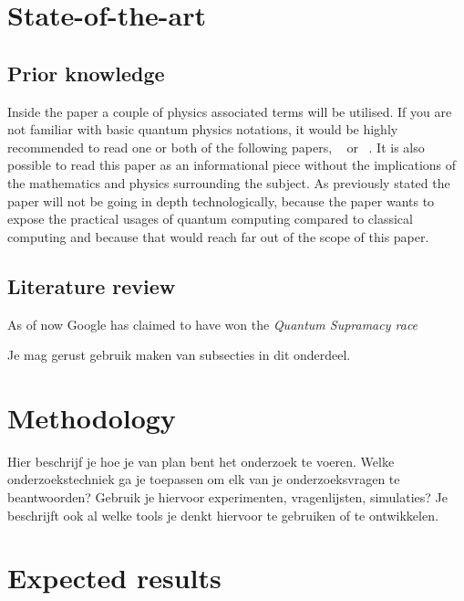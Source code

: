 
\section{State-of-the-art}
\label{sec:state-of-the-art}
\subsection{Prior knowledge}
Inside the paper a couple of physics associated terms will be utilised. If you are not familiar with basic quantum physics notations, it would be highly recommended to read one or both of the following papers, ~\textcite{Rieffel1998} or ~\textcite{Shor2000}. It is also possible to read this paper as an informational piece without the implications of the mathematics and physics surrounding the subject. As previously stated the paper will not be going in depth technologically, because the paper wants to expose the practical usages of quantum computing compared to classical computing and because that would reach far out of the scope of this paper.

\subsection{Literature review}

As of now Google has claimed to have won the \emph{Quantum Supramacy race} ~\autocite{Google2019}

Je mag gerust gebruik maken van subsecties in dit onderdeel.

\section{Methodology}
\label{sec:methodologie}

Hier beschrijf je hoe je van plan bent het onderzoek te voeren. Welke onderzoekstechniek ga je toepassen om elk van je onderzoeksvragen te beantwoorden? Gebruik je hiervoor experimenten, vragenlijsten, simulaties? Je beschrijft ook al welke tools je denkt hiervoor te gebruiken of te ontwikkelen.

\section{Expected results}
\label{sec:verwachte_resultaten}

